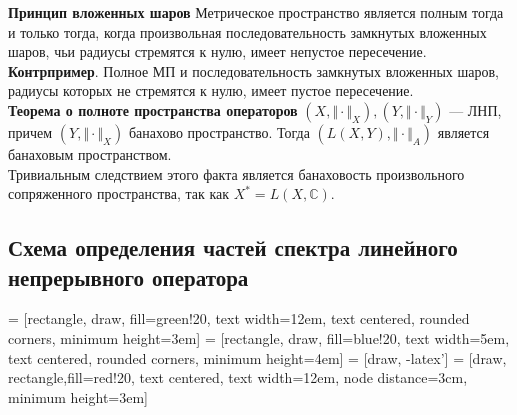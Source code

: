 \documentclass[12pt,a4paper]{scrartcl}
\begin{document}
\textbf{Принцип вложенных шаров} Метрическое пространство является полным тогда и только тогда, когда произвольная последовательность замкнутых вложенных шаров, чьи радиусы стремятся к нулю, имеет непустое пересечение. \\
\textbf{Контрпример}. Полное МП и последовательность замкнутых вложенных шаров, радиусы которых не стремятся к нулю, имеет пустое пересечение. \\

\textbf{Теорема о полноте пространства операторов} $(X, \Vert \cdot \Vert_X), (Y, \Vert \cdot \Vert_Y)$ — ЛНП, причем $(Y, \Vert \cdot \Vert_X)$ банахово пространство. Тогда $(L(X, Y), \Vert \cdot\Vert_A)$ является банаховым пространством. \\
Тривиальным следствием этого факта является банаховость произвольного сопряженного пространства, так как $X^* = L(X, \mathbb{C}).$\\

\newpage
\subsection*{Схема определения частей спектра линейного непрерывного оператора}

 = [rectangle, draw, fill=green!20,  text width=12em, text centered, rounded corners, minimum height=3em]
 = [rectangle, draw, fill=blue!20, 
    text width=5em, text centered, rounded corners, minimum height=4em]
 = [draw, -latex']
 = [draw, rectangle,fill=red!20,  text centered, text width=12em, node distance=3cm,
    minimum height=3em]
\end{document}
